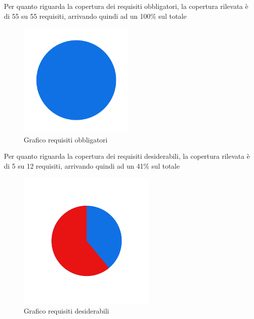 Per quanto riguarda la copertura dei requisiti obbligatori, la copertura rilevata è di 55 su 55
requisiti, arrivando quindi ad un 100\% sul totale

\begin{figure}[H]
    \centering
    \includegraphics[width=0.5\textwidth]{images/requisiti_o.png}
    \caption{Grafico requisiti obbligatori}
    \label{fig:Requisiti Obbligatori}
\end{figure}



Per quanto riguarda la copertura dei requisiti desiderabili, la copertura rilevata è di 5 su 12
requisiti, arrivando quindi ad un 41\% sul totale
\begin{figure}[H]
    \centering
    \includegraphics[width=0.6\textwidth]{images/requisiti_d.png}
    \caption{Grafico requisiti desiderabili}
    \label{fig:Requisiti Desiderabili}
\end{figure}



